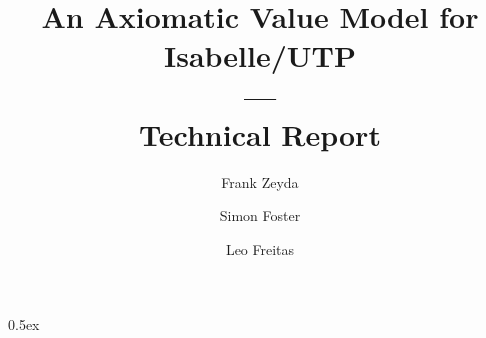 \documentclass[11pt,a4paper]{article}
\begin{document}

\title{An Axiomatic Value Model for Isabelle/UTP\\---\\Technical Report}

\author{Frank Zeyda \and Simon Foster \and Leo Freitas}

\maketitle

\tableofcontents

\newpage

\parindent 0pt\parskip 0.5ex


%


\newpage

%

%


\newpage


\newpage


\newpage


\newpage


\newpage


\newpage


\newpage


\newpage


\newpage


\newpage


\newpage


\newpage

%


\newpage


\newpage


\newpage


\newpage


\newpage
\end{document}
